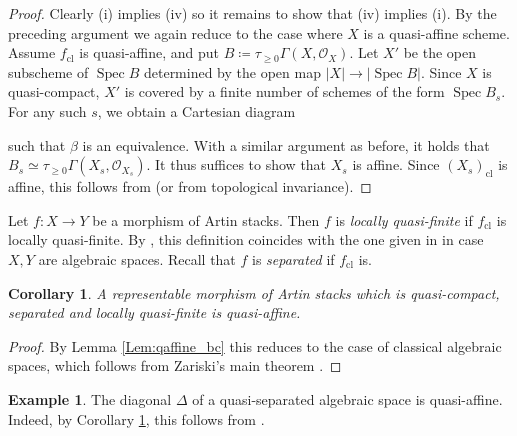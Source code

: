 \documentclass[a4paper,twoside,11pt]{amsart}
\theoremstyle{plain}
\newtheorem{corollary}[theorem]{Corollary}
\theoremstyle{definition}
\newtheorem{example}[theorem]{Example}
\theoremstyle{remark}
\numberwithin{equation}{section}
\DeclareMathOperator{\Spec}{Spec} %
\newcommand{\cl}{\mathrm{cl}} %
\newcommand{\oO}{\mathcal{O}}
\begin{document}
\begin{proof}
    Clearly (i) implies (iv) so it remains to show that (iv) implies (i). By the preceding argument we again reduce to the case where $X$ is a quasi-affine scheme. Assume $f_\cl$ is quasi-affine, and put $B \coloneqq \tau_{\geq 0}\Gamma(X,\oO_X)$. Let $X'$ be the open subscheme of $\Spec B$ determined by the open map $\lvert X \rvert \to \lvert \Spec B \rvert$. Since $X$ is quasi-compact, $X'$ is covered by a finite number of schemes of the form $\Spec B_s$. For any such $s$, we obtain a Cartesian diagram
    \begin{center}
    \end{center}
    such that $\beta$ is an equivalence. With a similar argument as before, it holds that $B_s \simeq \tau_{\geq 0}\Gamma(X_s,\oO_{X_s})$. It thus suffices to show that $X_s$ is affine. Since $(X_s)_\cl$ is affine, this follows from \cite[Cor.~1.1.6.3]{LurieSpectral} (or from topological invariance).
\end{proof}

Let $f \colon X \to Y$ be a morphism of Artin stacks. Then $f$ is \emph{locally quasi-finite} if $f_\cl$ is locally quasi-finite. By \cite[\href{https://stacks.math.columbia.edu/tag/0397}{Tag 0397}]{stacks-project}, this definition coincides with the one given in \cite[Def.~3.3.1.1]{LurieSpectral} in case $X,Y$ are algebraic spaces. Recall that $f$ is \emph{separated} if $f_\cl$ is.

\begin{corollary}
\label{Cor:Zar_main_thm}
    A representable morphism of Artin stacks which is quasi-compact, separated and locally quasi-finite is quasi-affine.
\end{corollary}

\begin{proof}
    By Lemma \ref{Lem:qaffine_bc} this reduces to the case of classical algebraic spaces, which follows from Zariski's main theorem \cite[\href{https://stacks.math.columbia.edu/tag/082J}{Tag 082J}]{stacks-project}.
\end{proof}

\begin{example}
    \label{Ex:algsp_quasiaff}
    The diagonal $\Delta$ of a quasi-separated algebraic space is quasi-affine. Indeed, by Corollary \ref{Cor:Zar_main_thm}, this follows from \cite[\href{https://stacks.math.columbia.edu/tag/02X4}{Tag 02X4}]{stacks-project}.     
\end{example}
\end{document}

